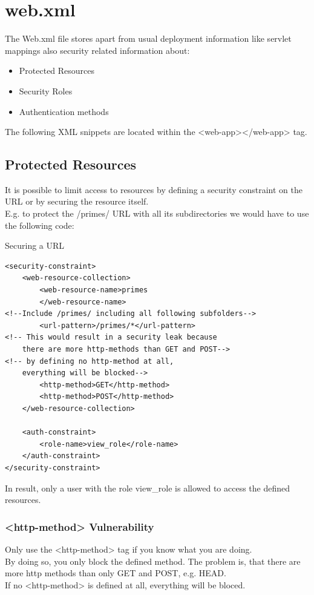 \documentclass[12pt,a4paper]{report}
\begin{document}
\section{web.xml}
The Web.xml file stores apart from usual deployment information like servlet mappings also security related information about:\\
\begin{itemize}
	\item Protected Resources
	\item Security Roles
	\item Authentication methods
\end{itemize}
The following XML snippets are located within the <web-app></web-app> tag.

\subsection{Protected Resources}
It is possible to limit access to resources by defining a security constraint on the URL or by securing the resource itself.\\
E.g. to protect the /primes/ URL with all its subdirectories we would have to use the following code:\\
\begin{bclogo}[couleur=yellow!15,arrondi=0.1,logo=\bccrayon, ombre = true]{Securing a URL}
\begin{lstlisting}[style=XML]
<security-constraint>
	<web-resource-collection>
		<web-resource-name>primes
		</web-resource-name>
<!--Include /primes/ including all following subfolders-->
		<url-pattern>/primes/*</url-pattern>
<!-- This would result in a security leak because 
	there are more http-methods than GET and POST-->
<!-- by defining no http-method at all, 
	everything will be blocked-->
		<http-method>GET</http-method>
		<http-method>POST</http-method>
	</web-resource-collection>
	
	<auth-constraint>
		<role-name>view_role</role-name>
	</auth-constraint>
</security-constraint>
\end{lstlisting}
\end{bclogo}
In result, only a user with the role view\_role is allowed to access the defined resources.
\subsubsection*{<http-method> Vulnerability}
Only use the <http-method> tag if you know what you are doing.\\
By doing so, you only block the defined method. The problem is, that there are more http methods than only GET and POST, e.g. HEAD.\\
If no <http-method> is defined at all, everything will be bloced.\\
\end{document}
